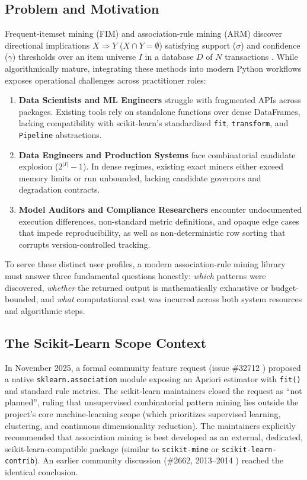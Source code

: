 \documentclass[twocolumn,10pt]{article}
\begin{document}
\subsection{Problem and Motivation}
Frequent-itemset mining (FIM) and association-rule mining (ARM) discover directional implications $X \Rightarrow Y$ ($X \cap Y = \emptyset$) satisfying support ($\sigma$) and confidence ($\gamma$) thresholds over an item universe $I$ in a database $D$ of $N$ transactions \cite{agrawal1994,han2000,zaki2000}. While algorithmically mature, integrating these methods into modern Python workflows exposes operational challenges across practitioner roles:
\begin{enumerate}\setlength{\itemsep}{1pt}\setlength{\parskip}{0pt}
  \item \textbf{Data Scientists and ML Engineers} struggle with fragmented APIs across packages. Existing tools rely on standalone functions over dense DataFrames, lacking compatibility with scikit-learn's standardized \texttt{fit}, \texttt{transform}, and \texttt{Pipeline} abstractions.
  \item \textbf{Data Engineers and Production Systems} face combinatorial candidate explosion ($2^{|I|} - 1$). In dense regimes, existing exact miners either exceed memory limits or run unbounded, lacking candidate governors and degradation contracts.
  \item \textbf{Model Auditors and Compliance Researchers} encounter undocumented execution differences, non-standard metric definitions, and opaque edge cases that impede reproducibility, as well as non-deterministic row sorting that corrupts version-controlled tracking.
\end{enumerate}

To serve these distinct user profiles, a modern association-rule mining library must answer three fundamental questions honestly: \emph{which} patterns were discovered, \emph{whether} the returned output is mathematically exhaustive or budget-bounded, and \emph{what} computational cost was incurred across both system resources and algorithmic steps.

\subsection{The Scikit-Learn Scope Context}
\label{sec:sklearn_scope}
In November 2025, a formal community feature request (issue \#32712 \cite{sklearn32712}) proposed a native \texttt{sklearn.association} module exposing an Apriori estimator with \texttt{fit()} and standard rule metrics. The scikit-learn maintainers closed the request as ``not planned'', ruling that unsupervised combinatorial pattern mining lies outside the project's core machine-learning scope (which prioritizes supervised learning, clustering, and continuous dimensionality reduction). The maintainers explicitly recommended that association mining is best developed as an external, dedicated, scikit-learn-compatible package (similar to \texttt{scikit-mine} or \texttt{scikit-learn-contrib}). An earlier community discussion (\#2662, 2013--2014 \cite{sklearn2662}) reached the identical conclusion.
\end{document}
